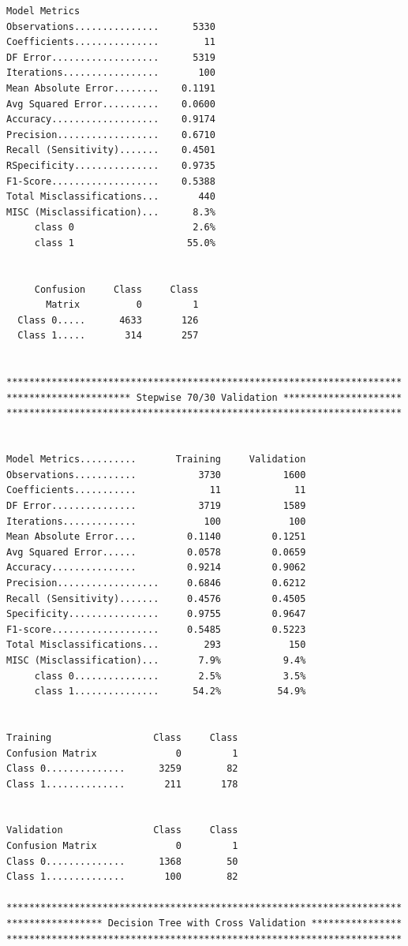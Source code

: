 \documentclass[12pt]{article}
\begin{document}
\begin{verbatim}
Model Metrics
Observations...............      5330
Coefficients...............        11
DF Error...................      5319
Iterations.................       100
Mean Absolute Error........    0.1191
Avg Squared Error..........    0.0600
Accuracy...................    0.9174
Precision..................    0.6710
Recall (Sensitivity).......    0.4501
RSpecificity...............    0.9735
F1-Score...................    0.5388
Total Misclassifications...       440
MISC (Misclassification)...      8.3%
     class 0                     2.6%
     class 1                    55.0%


     Confusion     Class     Class
       Matrix          0         1
  Class 0.....      4633       126
  Class 1.....       314       257


**********************************************************************
********************** Stepwise 70/30 Validation *********************
**********************************************************************


Model Metrics..........       Training     Validation
Observations...........           3730           1600
Coefficients...........             11             11
DF Error...............           3719           1589
Iterations.............            100            100
Mean Absolute Error....         0.1140         0.1251
Avg Squared Error......         0.0578         0.0659
Accuracy...............         0.9214         0.9062
Precision..................     0.6846         0.6212
Recall (Sensitivity).......     0.4576         0.4505
Specificity................     0.9755         0.9647
F1-score...................     0.5485         0.5223
Total Misclassifications...        293            150
MISC (Misclassification)...       7.9%           9.4%
     class 0...............       2.5%           3.5%
     class 1...............      54.2%          54.9%


Training                  Class     Class
Confusion Matrix              0         1
Class 0..............      3259        82
Class 1..............       211       178


Validation                Class     Class
Confusion Matrix              0         1
Class 0..............      1368        50
Class 1..............       100        82

**********************************************************************
***************** Decision Tree with Cross Validation ****************
**********************************************************************


\end{verbatim}
\end{document}
